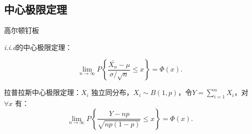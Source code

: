\subsection{中心极限定理}%
\label{sub:中心极限定理}
\begin{eg}
    高尔顿钉板
\end{eg}
\begin{cor}
    \textit{i.i.d}的中心极限定理：

    \[
        \lim_{n \to \infty} P\left\{ \frac{\bar{X_n}-\mu}{\sigma /\sqrt{n}  }\le x  \right\} =\Phi\left( x \right) 
    .\] 
\end{cor}
\begin{cor}
    拉普拉斯中心极限定理：$X_i$ 独立同分布，$X_i\sim B\left( 1,p \right) $，令$Y=\sum_{i=1}^{n} X_i$，对$\forall x$ 有：
    \[
        \lim_{n \to \infty} P\left\{ \frac{Y-np}{\sqrt{np\left( 1-p \right) } } \le x \right\} =\Phi\left( x \right) 
    .\]
\end{cor}

